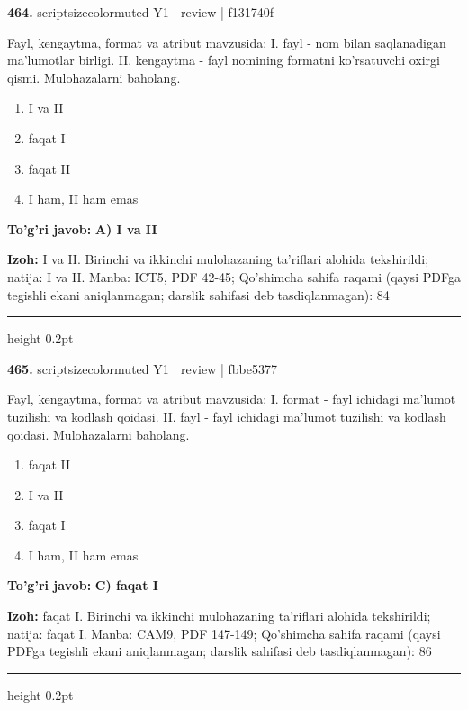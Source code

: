 \documentclass[10pt,a4paper]{article}
\begin{document}
{\bfseries\sffamily\color{ink} 464.} {scriptsizecolor{muted} Y1 | review | f131740f}
\par
Fayl, kengaytma, format va atribut mavzusida: I. fayl - nom bilan saqlanadigan ma'lumotlar birligi. II. kengaytma - fayl nomining formatni ko'rsatuvchi oxirgi qismi. Mulohazalarni baholang.
\begin{enumerate}[label=\Alph*),leftmargin=9mm]
\item I va II
\item faqat I
\item faqat II
\item I ham, II ham emas
\end{enumerate}
\begin{tcolorbox}[enhanced,breakable,colback=teal!4,colframe=teal!60!black,boxrule=0.45pt,arc=1.2mm,left=2.7mm,right=2.7mm,top=1.8mm,bottom=1.8mm,before skip=2mm,after skip=2mm]
{\bfseries\sffamily\color{teal}To'g'ri javob:} \textbf{A) I va II}
\par\smallskip
{\bfseries Izoh:} I va II. Birinchi va ikkinchi mulohazaning ta'riflari alohida tekshirildi; natija: I va II. Manba: ICT5, PDF 42-45; Qo'shimcha sahifa raqami (qaysi PDFga tegishli ekani aniqlanmagan; darslik sahifasi deb tasdiqlanmagan): 84
\end{tcolorbox}
\vspace{2mm}\hrule height 0.2pt\vspace{3mm}

{\bfseries\sffamily\color{ink} 465.} {scriptsizecolor{muted} Y1 | review | fbbe5377}
\par
Fayl, kengaytma, format va atribut mavzusida: I. format - fayl ichidagi ma'lumot tuzilishi va kodlash qoidasi. II. fayl - fayl ichidagi ma'lumot tuzilishi va kodlash qoidasi. Mulohazalarni baholang.
\begin{enumerate}[label=\Alph*),leftmargin=9mm]
\item faqat II
\item I va II
\item faqat I
\item I ham, II ham emas
\end{enumerate}
\begin{tcolorbox}[enhanced,breakable,colback=teal!4,colframe=teal!60!black,boxrule=0.45pt,arc=1.2mm,left=2.7mm,right=2.7mm,top=1.8mm,bottom=1.8mm,before skip=2mm,after skip=2mm]
{\bfseries\sffamily\color{teal}To'g'ri javob:} \textbf{C) faqat I}
\par\smallskip
{\bfseries Izoh:} faqat I. Birinchi va ikkinchi mulohazaning ta'riflari alohida tekshirildi; natija: faqat I. Manba: CAM9, PDF 147-149; Qo'shimcha sahifa raqami (qaysi PDFga tegishli ekani aniqlanmagan; darslik sahifasi deb tasdiqlanmagan): 86
\end{tcolorbox}
\vspace{2mm}\hrule height 0.2pt\vspace{3mm}
\end{document}
